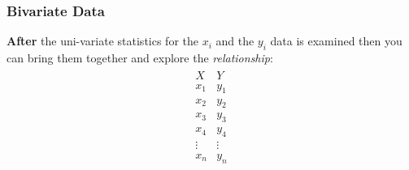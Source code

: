 \begin{frame}
  \frametitle{Bivariate Data}

  \textbf{After} the uni-variate statistics for the $x_i$ and the
  $y_i$ data is examined then you can bring them together and explore
  the \textit{relationship}:
  \begin{eqnarray*}
    \begin{array}{l|l}
      X & Y \\ \hline
      x_1 & y_1 \\
      x_2 & y_2 \\
      x_3 & y_3 \\
      x_4 & y_4 \\
      \vdots & \vdots \\
      x_n & y_n
  \end{array}
\end{eqnarray*}

\end{frame}

